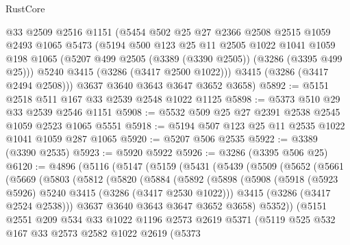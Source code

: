 \begin{lexlean}{RustCore}
\begin{coremodule}
      @33
      @2509
      @2516
      @1151
      (@5454
        @502
        @25
        @27
        @2366
        @2508
        @2515
        @1059
        @2493
        @1065
        @5473
        (@5194
          @500
          @123
          @25
          @11
          @2505
          @1022
          @1041
          @1059
          @198
          @1065
          (@5207 @499 @2505 (@3389 (@3390 @2505)) (@3286 (@3395 @499 @25)))
          @5240
          @3415
          (@3286 (@3417 @2500 @1022)))
        @3415
        (@3286 (@3417 @2494 @2508)))
      @3637
      @3640
      @3643
      @3647
      @3652
      @3658)
@5892 := @5151 @2518 @511 @167 @33 @2539 @2548 @1022 @1125
@5898 := @5373 @510 @29 @33 @2539 @2546 @1151
@5908 := @5532 @509 @25 @27 @2391 @2538 @2545 @1059 @2523 @1065 @5551
@5918 := @5194 @507 @123 @25 @11 @2535 @1022 @1041 @1059 @287 @1065
@5920 := @5207 @506 @2535
@5922 := @3389 (@3390 @2535)
@5923 := @5920 @5922
@5926 := @3286 (@3395 @506 @25)
@6120 := @4896
    (@5116
      (@5147
        (@5159
          (@5431
            (@5439
              (@5509
                (@5652
                  (@5661
                    (@5669
                      (@5803
                        (@5812
                          (@5820
                            (@5884
                              (@5892
                                (@5898
                                  (@5908
                                    (@5918 (@5923 @5926) @5240 @3415 (@3286 (@3417 @2530 @1022)))
                                    @3415
                                    (@3286 (@3417 @2524 @2538)))
                                  @3637
                                  @3640
                                  @3643
                                  @3647
                                  @3652
                                  @3658)
                                @5352))
                            (@5151
                              @2551
                              @209
                              @534
                              @33
                              @1022
                              @1196
                              @2573
                              @2619
                              @5371
                              (@5119
                                @525
                                @532
                                @167
                                @33
                                @2573
                                @2582
                                @1022
                                @2619
                                (@5373

\end{coremodule}
\end{lexlean}
